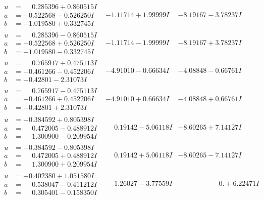 \documentclass[1p]{elsarticle_modified}
\theoremstyle{definition}
\begin{document}
$$\begin{array}{c|c|c}
\begin{aligned}
u &= \phantom{-}0.285396 + 0.860515 I \\
a &= -0.522568 - 0.526250 I \\
b &= -1.019580 + 0.332745 I\end{aligned}
 & -1.11714 + 1.99999 I & -8.19167 - 3.78237 I \\ \hline\begin{aligned}
u &= \phantom{-}0.285396 - 0.860515 I \\
a &= -0.522568 + 0.526250 I \\
b &= -1.019580 - 0.332745 I\end{aligned}
 & -1.11714 - 1.99999 I & -8.19167 + 3.78237 I \\ \hline\begin{aligned}
u &= \phantom{-}0.765917 + 0.475113 I \\
a &= -0.461266 - 0.452206 I \\
b &= -0.42801 - 2.31073 I\end{aligned}
 & -4.91010 - 0.66634 I & -4.08848 - 0.66761 I \\ \hline\begin{aligned}
u &= \phantom{-}0.765917 - 0.475113 I \\
a &= -0.461266 + 0.452206 I \\
b &= -0.42801 + 2.31073 I\end{aligned}
 & -4.91010 + 0.66634 I & -4.08848 + 0.66761 I \\ \hline\begin{aligned}
u &= -0.384592 + 0.805398 I \\
a &= \phantom{-}0.472005 - 0.488912 I \\
b &= \phantom{-}1.300900 - 0.209954 I\end{aligned}
 & \phantom{-}0.19142 - 5.06118 I & -8.60265 + 7.14127 I \\ \hline\begin{aligned}
u &= -0.384592 - 0.805398 I \\
a &= \phantom{-}0.472005 + 0.488912 I \\
b &= \phantom{-}1.300900 + 0.209954 I\end{aligned}
 & \phantom{-}0.19142 + 5.06118 I & -8.60265 - 7.14127 I \\ \hline\begin{aligned}
u &= -0.402380 + 1.051580 I \\
a &= \phantom{-}0.538047 - 0.411212 I \\
b &= \phantom{-}0.305401 - 0.158350 I\end{aligned}
 & \phantom{-}1.26027 - 3.77559 I & \phantom{-0.000000 -}0. + 6.22471 I \\ \hline\begin{aligned}

\end{aligned}
\end{array}$$
\end{document}

